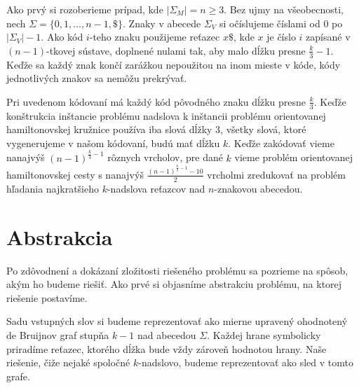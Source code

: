 Ako prvý si rozoberieme prípad, kde $|\Sigma_M| = n \ge 3$. Bez ujmy na všeobecnosti,
nech $\Sigma = \{0, 1, \ldots, n-1, \$ \}$. Znaky v abecede $\Sigma_V$ si očíslujeme
číslami od $0$ po $|\Sigma_V| - 1$. Ako kód $i$-teho znaku použijeme reťazec
$x \$ $, kde $x$ je číslo $i$ zapísané v $(n-1)$-tkovej sústave, doplnené nulami tak,
aby malo dĺžku presne $\frac{k}{3} - 1$. Keďže sa každý znak končí zarážkou nepoužitou na
inom mieste v kóde, kódy jednotlivých znakov sa nemôžu prekrývať.

Pri uvedenom kódovaní má každý kód pôvodného znaku dĺžku presne $\frac{k}{3}$. Keďže
konštrukcia inštancie problému nadslova k inštancii problému orientovanej hamiltonovskej
kružnice používa iba slová dĺžky $3$, všetky slová, ktoré vygenerujeme v našom kódovaní,
budú mať dĺžku $k$. Keďže zakódovať vieme nanajvýš $(n-1)^{\frac{k}{3} - 1}$ rôznych
vrcholov, pre dané $k$ vieme problém orientovanej hamiltonovskej cesty s nanajvýš
$\frac{(n-1)^{\frac{k}{3}-1} - 10}{2}$ vrcholmi zredukovať na problém hľadania
najkratšieho $k$-nadslova reťazcov nad $n$-znakovou abecedou.

\section{Abstrakcia}

Po zdôvodnení a dokázaní zložitosti riešeného problému sa pozrieme na spôsob, akým ho budeme
riešiť. Ako prvé si objasníme abstrakciu problému, na ktorej riešenie postavíme.

Sadu vstupných slov si budeme reprezentovať ako mierne upravený ohodnotený de Bruijnov \cite{de_bruijn}
graf stupňa $k - 1$ nad abecedou $\Sigma$. Každej hrane symbolicky priradíme reťazec,
ktorého dĺžka bude vždy zároveň hodnotou hrany.
Naše riešenie, čiže nejaké spoločné $k$-nadslovo, budeme reprezentovať ako sled v tomto grafe.

